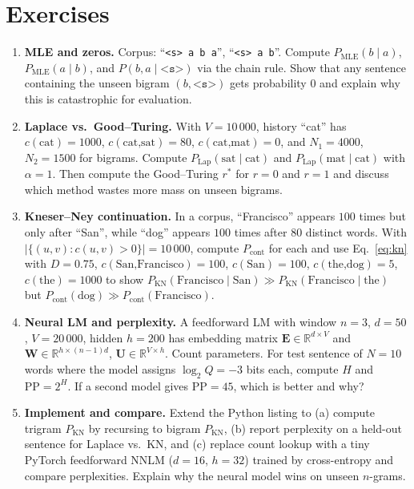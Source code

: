 \section{Exercises}\label{sec:ch05-exercises}
\begin{enumerate}[label=E5.\arabic*, leftmargin=*, itemsep=0.7em]
    \item \textbf{MLE and zeros.} Corpus: ``\texttt{<s> a b a}'', ``\texttt{<s> a b}''. Compute $P_{\text{MLE}}(b\mid a)$, $P_{\text{MLE}}(a\mid b)$, and $P(b,a\mid\texttt{<s>})$ via the chain rule. Show that any sentence containing the unseen bigram $(b,\texttt{<s>})$ gets probability $0$ and explain why this is catastrophic for evaluation.
    \item \textbf{Laplace vs.\ Good--Turing.} With $V=10\,000$, history ``cat'' has $c(\text{cat})=1000$, $c(\text{cat,sat})=80$, $c(\text{cat,mat})=0$, and $N_{1}=4000$, $N_{2}=1500$ for bigrams. Compute $P_{\text{Lap}}(\text{sat}\mid\text{cat})$ and $P_{\text{Lap}}(\text{mat}\mid\text{cat})$ with $\alpha=1$. Then compute the Good--Turing $r^{*}$ for $r=0$ and $r=1$ and discuss which method wastes more mass on unseen bigrams.
    \item \textbf{Kneser--Ney continuation.} In a corpus, ``Francisco'' appears $100$ times but only after ``San'', while ``dog'' appears $100$ times after $80$ distinct words. With $|\{(u,v):c(u,v)>0\}|=10\,000$, compute $P_{\text{cont}}$ for each and use Eq.~\eqref{eq:kn} with $D=0.75$, $c(\text{San,Francisco})=100$, $c(\text{San})=100$, $c(\text{the,dog})=5$, $c(\text{the})=1000$ to show $P_{\text{KN}}(\text{Francisco}\mid\text{San})\gg P_{\text{KN}}(\text{Francisco}\mid\text{the})$ but $P_{\text{cont}}(\text{dog})\gg P_{\text{cont}}(\text{Francisco})$.
    \item \textbf{Neural LM and perplexity.} A feedforward LM with window $n=3$, $d=50$, $V=20\,000$, hidden $h=200$ has embedding matrix $\mathbf{E}\in\mathbb{R}^{d\times V}$ and $\mathbf{W}\in\mathbb{R}^{h\times (n-1)d}$, $\mathbf{U}\in\mathbb{R}^{V\times h}$. Count parameters. For test sentence of $N=10$ words where the model assigns $\log_{2}Q=-3$ bits each, compute $H$ and $\text{PP}=2^{H}$. If a second model gives $\text{PP}=45$, which is better and why?
    \item \textbf{Implement and compare.} Extend the Python listing to (a) compute trigram $P_{\text{KN}}$ by recursing to bigram $P_{\text{KN}}$, (b) report perplexity on a held-out sentence for Laplace vs.\ KN, and (c) replace count lookup with a tiny PyTorch feedforward NNLM ($d=16$, $h=32$) trained by cross-entropy and compare perplexities. Explain why the neural model wins on unseen $n$-grams.
\end{enumerate}
